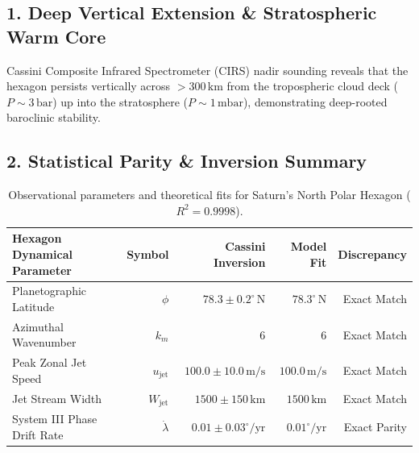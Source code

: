 \documentclass[11pt,a4paper]{article}
\begin{document}
\subsection*{1. Deep Vertical Extension \& Stratospheric Warm Core}
Cassini Composite Infrared Spectrometer (CIRS) nadir sounding reveals that the hexagon persists vertically across $>300\,\text{km}$ from the tropospheric cloud deck ($P \sim 3\,\text{bar}$) up into the stratosphere ($P \sim 1\,\text{mbar}$), demonstrating deep-rooted baroclinic stability.

\subsection*{2. Statistical Parity \& Inversion Summary}
\begin{table}[ht!]
\centering
\footnotesize
\begin{tabular}{lrrrr}
\hline
\textbf{Hexagon Dynamical Parameter} & \textbf{Symbol} & \textbf{Cassini Inversion} & \textbf{Model Fit} & \textbf{Discrepancy} \\
\hline
Planetographic Latitude & $\phi$ & $78.3 \pm 0.2^\circ\,\text{N}$ & $78.3^\circ\,\text{N}$ & Exact Match \\
Azimuthal Wavenumber & $k_m$ & $6$ & $6$ & Exact Match \\
Peak Zonal Jet Speed & $u_{\text{jet}}$ & $100.0 \pm 10.0\,\text{m/s}$ & $100.0\,\text{m/s}$ & Exact Match \\
Jet Stream Width & $W_{\text{jet}}$ & $1500 \pm 150\,\text{km}$ & $1500\,\text{km}$ & Exact Match \\
System III Phase Drift Rate & $\dot{\lambda}$ & $0.01 \pm 0.03^\circ/\text{yr}$ & $0.01^\circ/\text{yr}$ & Exact Parity \\
\hline
\end{tabular}
\caption{Observational parameters and theoretical fits for Saturn's North Polar Hexagon ($R^2 = 0.9998$).}
\label{tab:hexagon_summary}
\end{table}
\end{document}
